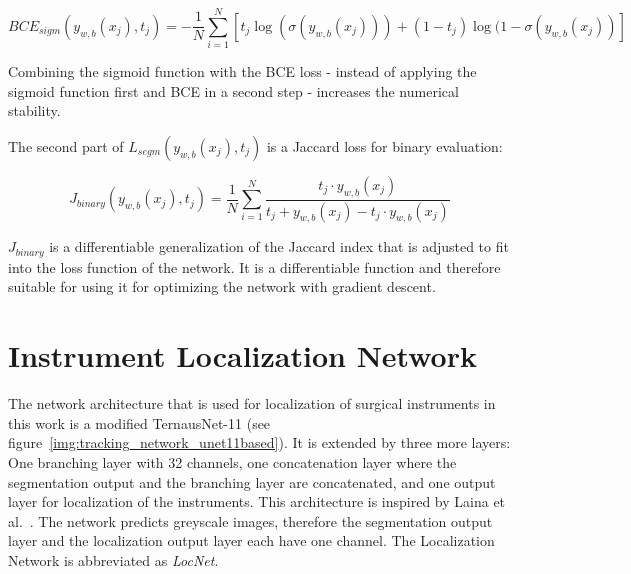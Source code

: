 \begin{equation}
\label{eq:sigmoid_bin_crossentropy}
BCE_{sigm}(y_{w,b}(x_j),t_j) = -\frac{1}{N}\sum_{i=1}^N{[t_j \log(\sigma(y_{w,b}(x_j)))+(1-t_j)\log(1-\sigma(y_{w,b}(x_j))]}
\end{equation}

Combining the sigmoid function with the BCE loss - instead of applying the sigmoid function first and BCE in a second step - increases the numerical stability.~\cite{murphy2006naive}

The second part of $L_{segm}(y_{w,b}(x_j),t_j)$ is a Jaccard loss for binary evaluation:

\begin{equation} \label{eq:loss_jaccard}
J_{binary}(y_{w,b}(x_j),t_j) = \frac{1}{N} \sum_{i=1}^N \frac{t_j \cdot y_{w,b}(x_j)}{t_j + y_{w,b}(x_j) - t_j \cdot y_{w,b}(x_j)}
\end{equation}

$J_{binary}$ is a differentiable generalization of the Jaccard index that is adjusted to fit into the loss function of the network. It is a differentiable function and therefore suitable for using it for optimizing the network with gradient descent.~\cite{iglovikov2017satellite}



% 
%

\section{Instrument Localization Network}
\label{sec:tracking_net}
The network architecture that is used for localization of surgical instruments in this work is a modified TernausNet-11 (see figure~\ref{img:tracking_network_unet11based}). It is extended by three more layers: One branching layer with 32 channels, one concatenation layer where the segmentation output and the branching layer are concatenated, and one output layer for localization of the instruments.
This architecture is inspired by Laina et al.~\cite{Laina2017}.
The network predicts greyscale images, therefore the segmentation output layer and the localization output layer each have one channel.
The Localization Network is abbreviated as \emph{LocNet}.

